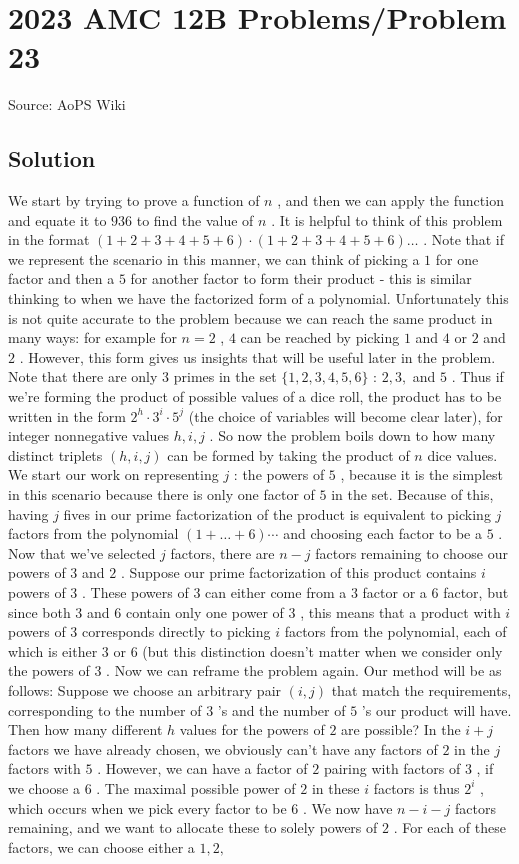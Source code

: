 \documentclass[12pt]{article}
\begin{document}
\section*{{2023 AMC 12B Problems/Problem 23}}
Source: AoPS Wiki

\subsection*{Solution}
We start by trying to prove a function of $n$ , and then we can apply the function and equate it to $936$ to find the value of $n$ . It is helpful to think of this problem in the format $(1+2+3+4+5+6) \cdot (1+2+3+4+5+6) \dots$ . Note that if we represent the scenario in this manner, we can think of picking a $1$ for one factor and then a $5$ for another factor to form their product - this is similar thinking to when we have the factorized form of a polynomial. Unfortunately this is not quite accurate to the problem because we can reach the same product in many ways: for example for $n=2$ , $4$ can be reached by picking $1$ and $4$ or $2$ and $2$ . However, this form gives us insights that will be useful later in the problem. Note that there are only $3$ primes in the set $\{1,2,3,4,5,6\}$ : $2,3,$ and $5$ . Thus if we're forming the product of possible values of a dice roll, the product has to be written in the form $2^h \cdot 3^i \cdot 5^j$ (the choice of variables will become clear later), for integer nonnegative values $h,i,j$ . So now the problem boils down to how many distinct triplets $(h,i,j)$ can be formed by taking the product of $n$ dice values. We start our work on representing $j$ : the powers of $5$ , because it is the simplest in this scenario because there is only one factor of $5$ in the set. Because of this, having $j$ fives in our prime factorization of the product is equivalent to picking $j$ factors from the polynomial $(1+\dots + 6) \cdots$ and choosing each factor to be a $5$ . Now that we've selected $j$ factors, there are $n-j$ factors remaining to choose our powers of $3$ and $2$ . Suppose our prime factorization of this product contains $i$ powers of $3$ . These powers of $3$ can either come from a $3$ factor or a $6$ factor, but since both $3$ and $6$ contain only one power of $3$ , this means that a product with $i$ powers of $3$ corresponds directly to picking $i$ factors from the polynomial, each of which is either $3$ or $6$ (but this distinction doesn't matter when we consider only the powers of $3$ . Now we can reframe the problem again. Our method will be as follows: Suppose we choose an arbitrary pair $(i,j)$ that match the requirements, corresponding to the number of $3$ 's and the number of $5$ 's our product will have. Then how many different $h$ values for the powers of $2$ are possible? In the $i+j$ factors we have already chosen, we obviously can't have any factors of $2$ in the $j$ factors with $5$ . However, we can have a factor of $2$ pairing with factors of $3$ , if we choose a $6$ . The maximal possible power of $2$ in these $i$ factors is thus $2^i$ , which occurs when we pick every factor to be $6$ . We now have $n-i-j$ factors remaining, and we want to allocate these to solely powers of $2$ . For each of these factors, we can choose either a $1,2,$ 
\end{document}
